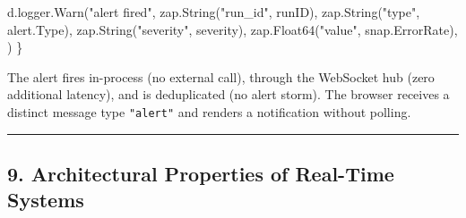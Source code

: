 \documentclass[
]{article}
\newenvironment{Shaded}{}{}
\newcommand{\NormalTok}[1]{#1}
\newcommand{\OperatorTok}[1]{\textcolor[rgb]{0.40,0.40,0.40}{#1}}
\newcommand{\StringTok}[1]{\textcolor[rgb]{0.25,0.44,0.63}{#1}}
\begin{document}
\begin{Shaded}
\begin{Highlighting}[]
\NormalTok{    d}\OperatorTok{.}\NormalTok{logger}\OperatorTok{.}\NormalTok{Warn}\OperatorTok{(}\StringTok{"alert fired"}\OperatorTok{,}
\NormalTok{        zap}\OperatorTok{.}\NormalTok{String}\OperatorTok{(}\StringTok{"run\_id"}\OperatorTok{,}\NormalTok{ runID}\OperatorTok{),}
\NormalTok{        zap}\OperatorTok{.}\NormalTok{String}\OperatorTok{(}\StringTok{"type"}\OperatorTok{,}\NormalTok{ alert}\OperatorTok{.}\NormalTok{Type}\OperatorTok{),}
\NormalTok{        zap}\OperatorTok{.}\NormalTok{String}\OperatorTok{(}\StringTok{"severity"}\OperatorTok{,}\NormalTok{ severity}\OperatorTok{),}
\NormalTok{        zap}\OperatorTok{.}\NormalTok{Float64}\OperatorTok{(}\StringTok{"value"}\OperatorTok{,}\NormalTok{ snap}\OperatorTok{.}\NormalTok{ErrorRate}\OperatorTok{),}
    \OperatorTok{)}
\OperatorTok{\}}
\end{Highlighting}
\end{Shaded}

The alert fires in-process (no external call), through the WebSocket hub
(zero additional latency), and is deduplicated (no alert storm). The
browser receives a distinct message type \texttt{"alert"} and renders a
notification without polling.

\begin{center}\rule{0.5\linewidth}{0.5pt}\end{center}

\hypertarget{architectural-properties-of-real-time-systems}{%
\subsection{9. Architectural Properties of Real-Time
Systems}\label{architectural-properties-of-real-time-systems}}
\end{document}
